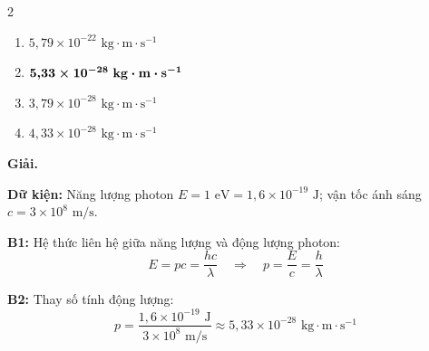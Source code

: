 \documentclass[11pt,a4paper]{article}
\begin{document}
\begin{multicols}{2}
\begin{enumerate}[label=\Alph*., itemsep=1pt, topsep=1pt, parsep=0pt, leftmargin=1.8em]
    \item $5{,}79 \times 10^{-22}\text{ kg}\cdot\text{m}\cdot\text{s}^{-1}$
    \item $\boldsymbol{5{,}33 \times 10^{-28}\text{ \textbf{kg}}\cdot\text{\textbf{m}}\cdot\text{\textbf{s}}^{\boldsymbol{-1}}}$
    \item $3{,}79 \times 10^{-28}\text{ kg}\cdot\text{m}\cdot\text{s}^{-1}$
    \item $4{,}33 \times 10^{-28}\text{ kg}\cdot\text{m}\cdot\text{s}^{-1}$
\end{enumerate}
\end{multicols}

\textbf{Giải.}

\textbf{Dữ kiện:} Năng lượng photon $E = 1\text{ eV} = 1{,}6 \times 10^{-19}\text{ J}$; vận tốc ánh sáng $c = 3 \times 10^8\text{ m/s}$.

\textbf{B1:} Hệ thức liên hệ giữa năng lượng và động lượng photon:
\begin{equation*}
    E = pc = \frac{hc}{\lambda} \quad \Longrightarrow \quad p = \frac{E}{c} = \frac{h}{\lambda}
\end{equation*}

\textbf{B2:} Thay số tính động lượng:
\begin{equation*}
    p = \frac{1{,}6 \times 10^{-19}\text{ J}}{3 \times 10^8\text{ m/s}} \approx 5{,}33 \times 10^{-28}\text{ kg}\cdot\text{m}\cdot\text{s}^{-1}
\end{equation*}
\end{document}
